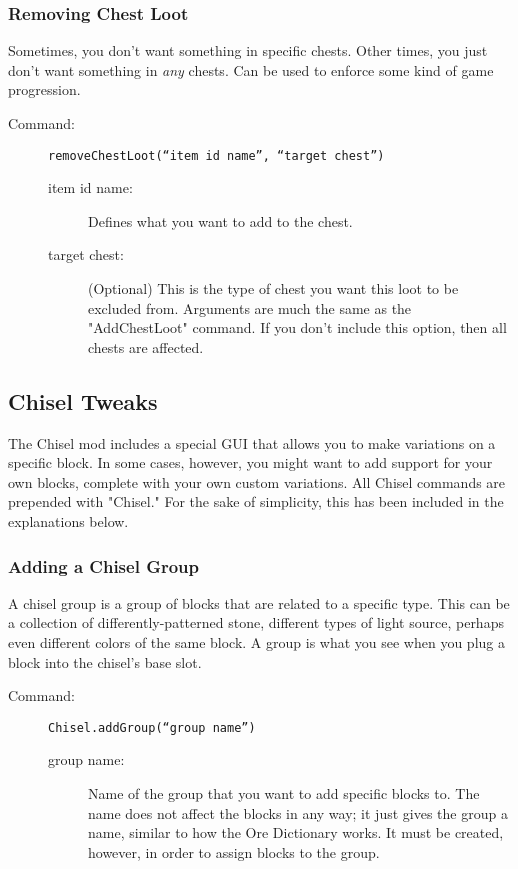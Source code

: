 \documentclass[letterpaper,titlepage,12pt]{article}
\begin{document}
\subsubsection{Removing Chest Loot}

Sometimes, you don't want something in specific chests.  Other times, you just don't want something in \emph{any} chests.  Can be used to enforce some kind of game progression.

\begin{description}
\item[Command:] \texttt{removeChestLoot(``item id name'', ``target chest'')}
\begin{description}
\item [item id name:] Defines what you want to add to the chest.
\item [target chest:] (Optional) This is the type of chest you want this loot to be excluded from.  Arguments are much the same as the "AddChestLoot" command. If you don't include this option, then all chests are affected.
\end{description}
\end{description}

\subsection{Chisel Tweaks}

The Chisel mod includes a special GUI that allows you to make variations on a specific block.  In some cases, however, you might want to add support for your own blocks, complete with your own custom variations.  All Chisel commands are prepended with "Chisel."  For the sake of simplicity, this has been included in the explanations below.

\subsubsection{Adding a Chisel Group}

A chisel group is a group of blocks that are related to a specific type.  This can be a collection of differently-patterned stone, different types of light source, perhaps even different colors of the same block.  A group is what you see when you plug a block into the chisel's base slot.

\begin{description}
\item[Command:] \texttt{Chisel.addGroup(``group name'')}
\begin{description}
\item [group name:] Name of the group that you want to add specific blocks to.  The name does not affect the blocks in any way; it just gives the group a name, similar to how the Ore Dictionary works.  It must be created, however, in order to assign blocks to the group.
\end{description}
\end{description}
\end{document}
